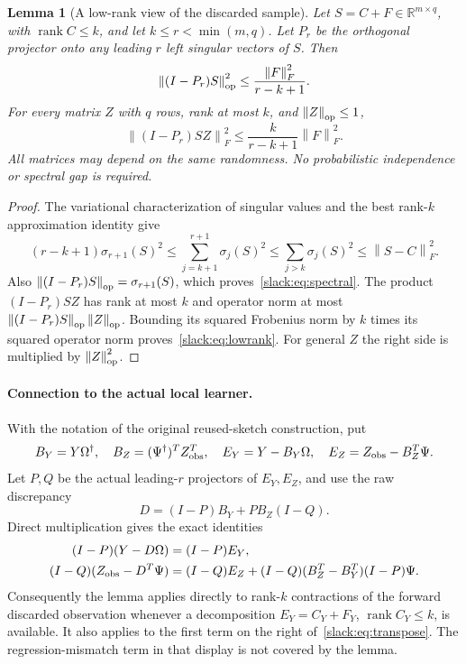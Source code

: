 \documentclass[11pt,oneside,openany,a4paper]{book}
\numberwithin{equation}{chapter}
\newtheorem{lemma}[theorem]{Lemma}
\theoremstyle{definition}
\theoremstyle{remark}
\newcommand{\F}[1]{\left\lVert#1\right\rVert_F}
\newcommand{\op}[1]{\left\lVert#1\right\rVert_{\rm op}}
\begin{document}
\begin{lemma}[A low-rank view of the discarded sample]
Let $S=C+F\in\mathbb R^{m\times q}$, with $\operatorname{rank}C\le k$, and let $k\le r<\min(m,q)$. Let $P_r$ be the orthogonal projector onto any leading $r$ left singular vectors of $S$. Then
\begin{equation}\label{slack:eq:spectral}
 \op{(I-P_r)S}^2
 \le \frac{\F F^2}{r-k+1}.
\end{equation}
For every matrix $Z$ with $q$ rows, rank at most $k$, and $\op Z\le1$,
\begin{equation}\label{slack:eq:lowrank}
 \F{(I-P_r)SZ}^2
 \le \frac{k}{r-k+1}\F F^2.
\end{equation}
All matrices may depend on the same randomness. No probabilistic independence or spectral gap is required.
\end{lemma}
\begin{proof}
The variational characterization of singular values and the best rank-$k$ approximation identity give
\[
 (r-k+1)\sigma_{r+1}(S)^2
 \le\sum_{j=k+1}^{r+1}\sigma_j(S)^2
 \le\sum_{j>k}\sigma_j(S)^2
 \le\F{S-C}^2.
\]
Also $\op{(I-P_r)S}=\sigma_{r+1}(S)$, which proves~\eqref{slack:eq:spectral}. The product $(I-P_r)SZ$ has rank at most $k$ and operator norm at most $\op{(I-P_r)S}\op Z$. Bounding its squared Frobenius norm by $k$ times its squared operator norm proves~\eqref{slack:eq:lowrank}. For general $Z$ the right side is multiplied by $\op Z^2$.
\end{proof}

\paragraph{Connection to the actual local learner.}
With the notation of the original reused-sketch construction, put
\[
 B_Y=Y\Omega^\dagger,\quad
 B_Z=(\Psi^\dagger)^T Z_{\rm obs}^T,\quad
 E_Y=Y-B_Y\Omega,\quad E_Z=Z_{\rm obs}-B_Z^T\Psi.
\]
Let $P,Q$ be the actual leading-$r$ projectors of $E_Y,E_Z$, and use the raw discrepancy
\[
 D=(I-P)B_Y+PB_Z(I-Q).
\]
Direct multiplication gives the exact identities
\begin{align}
 (I-P)(Y-D\Omega)&=(I-P)E_Y,\label{slack:eq:forward}\\
 (I-Q)(Z_{\rm obs}-D^T\Psi)
 &=(I-Q)E_Z
 +(I-Q)(B_Z^T-B_Y^T)(I-P)\Psi.\label{slack:eq:transpose}
\end{align}
Consequently the lemma applies directly to rank-$k$ contractions of the forward discarded observation whenever a decomposition $E_Y=C_Y+F_Y$, $\operatorname{rank}C_Y\le k$, is available. It also applies to the first term on the right of~\eqref{slack:eq:transpose}. The regression-mismatch term in that display is not covered by the lemma.
\end{document}
